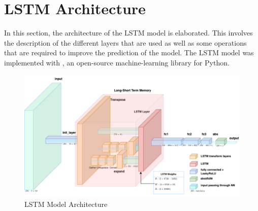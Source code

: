   \section{LSTM Architecture}
  \label{sec:lstm-architecture-and-implementation}

    In this section, the architecture of the LSTM model is elaborated.
    This involves the description of the different layers that are used as well as some operations that are required to improve the prediction of the model.
    The LSTM model was implemented with , an open-source machine-learning library for Python. 
    \begin{figure}
      \centering
      \includegraphics[scale=0.45]{figures/current_lstm_model.png}
      \caption{LSTM Model Architecture}
      \label{fig:lstm-model-architecture}
    \end{figure}

